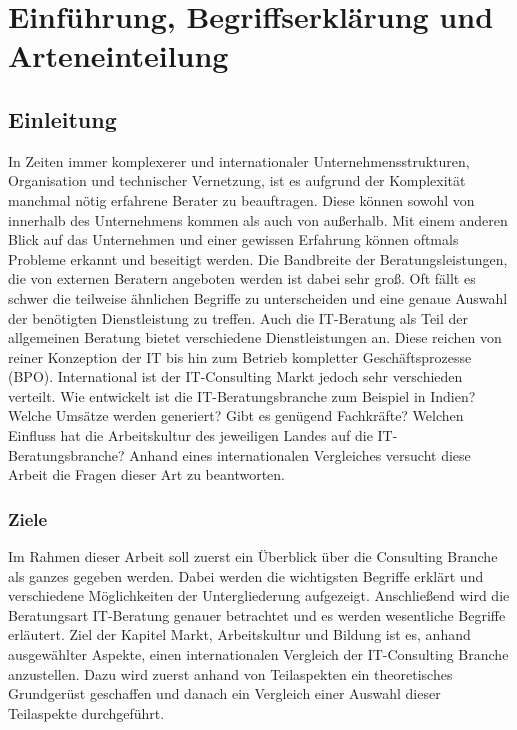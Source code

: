 \chapter{Einführung, Begriffserklärung und Arteneinteilung}
\section{Einleitung}
In Zeiten immer komplexerer und internationaler Unternehmensstrukturen, Organisation und technischer Vernetzung, ist es aufgrund der Komplexität manchmal nötig erfahrene Berater zu beauftragen. Diese können sowohl von innerhalb des Unternehmens kommen als auch von außerhalb. Mit einem anderen Blick auf das Unternehmen und einer gewissen Erfahrung können oftmals Probleme erkannt und beseitigt werden. Die Bandbreite der Beratungsleistungen, die von externen Beratern angeboten werden ist dabei sehr groß. Oft fällt es schwer die teilweise ähnlichen Begriffe zu unterscheiden und eine genaue Auswahl der benötigten Dienstleistung zu treffen. Auch die IT-Beratung als Teil der allgemeinen Beratung bietet verschiedene Dienstleistungen an. Diese reichen von reiner Konzeption der IT bis hin zum Betrieb kompletter Geschäftsprozesse (BPO). International ist der IT-Consulting Markt jedoch sehr verschieden verteilt. Wie entwickelt ist die IT-Beratungsbranche zum Beispiel in Indien? Welche Umsätze werden generiert? Gibt es genügend Fachkräfte? Welchen Einfluss hat die Arbeitskultur des jeweiligen Landes auf die IT-Beratungsbranche? Anhand eines internationalen Vergleiches versucht diese Arbeit die Fragen dieser Art zu beantworten.

\subsection*{Ziele}
Im Rahmen dieser Arbeit soll zuerst ein Überblick über die Consulting Branche als ganzes gegeben werden. Dabei werden die wichtigsten Begriffe erklärt und verschiedene Möglichkeiten der Untergliederung aufgezeigt. Anschließend wird die Beratungsart IT-Beratung genauer betrachtet und es werden wesentliche Begriffe erläutert. Ziel der Kapitel Markt, Arbeitskultur und Bildung ist es, anhand ausgewählter Aspekte, einen internationalen Vergleich der IT-Consulting Branche anzustellen. Dazu wird zuerst anhand von Teilaspekten ein theoretisches Grundgerüst geschaffen und danach ein Vergleich einer Auswahl dieser Teilaspekte durchgeführt.
